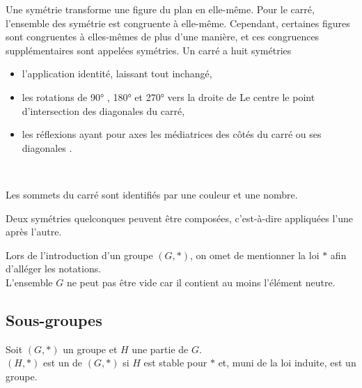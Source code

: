 \documentclass{book}
\begin{document}
\begin{Exemple}
Une symétrie transforme une figure du plan en elle-même. Pour le carré, l'ensemble des symétrie est  congruente à elle-même. Cependant, certaines figures sont congruentes à elles-mêmes de plus d'une manière, et ces congruences supplémentaires sont appelées symétries. Un carré a huit symétries
\begin{itemize}
\item l'application identité, laissant tout inchangé, 
\item les rotations de 90° , 180° et 270° vers la droite de Le centre le point d'intersection des diagonales du carré,
\item les réflexions ayant pour axes les médiatrices des côtés du carré  ou ses diagonales .
\end{itemize}

\begin{center}
\begin{Figure}
\\
\begin{Titre}
 Les sommets du carré sont identifiés par une couleur et une nombre.
\end{Titre}
\end{Figure}
\end{center}
Deux symétries quelconques peuvent être composées, c'est-à-dire appliquées l'une après l'autre.
\end{Exemple}

\begin{Remarque}
Lors de l'introduction d'un groupe $(G,*)$, on omet de mentionner la loi $*$ afin d'alléger les notations.\\
L'ensemble $G$ ne peut pas être vide car il contient au moins l'élément neutre.
\end{Remarque}
\subsection{Sous-groupes}
\begin{Definition}
Soit $(G, *)$ un groupe et $H$ une partie de $G$.\\
$(H, *)$ est un  de $(G, *)$  si $H$ est stable pour $*$ et, muni de la loi induite, est un groupe.
\end{Definition}
\end{document}
